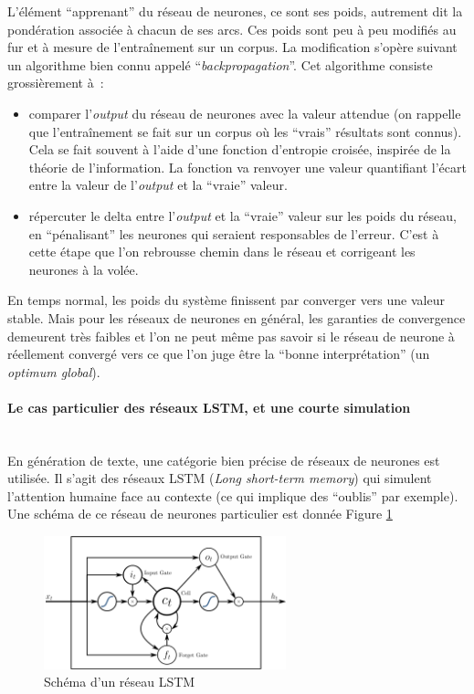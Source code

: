 \documentclass{article}
\newcommand{\subsubsubsection}[1]{\paragraph{#1}\mbox{}\\}
\begin{document}
					L'élément ``apprenant'' du réseau de neurones, ce sont ses poids, autrement dit la pondération associée à chacun de ses arcs. Ces poids sont peu à peu modifiés au fur et à mesure de l'entraînement sur un corpus. La modification s'opère suivant un algorithme bien connu appelé ``\textit{backpropagation}''. Cet algorithme consiste grossièrement à~:
					\vspace{2mm}
					\begin{itemize}
						\item comparer l'\textit{output} du réseau de neurones avec la valeur attendue (on rappelle que l'entraînement se fait sur un corpus où les ``vrais'' résultats sont connus). Cela se fait souvent à  l'aide d'une fonction d'entropie croisée, inspirée de la théorie de l'information. La fonction va renvoyer une valeur quantifiant l'écart entre la valeur de l'\textit{output} et la ``vraie'' valeur.
						\item répercuter le delta entre l'\textit{output} et la ``vraie'' valeur sur les poids du réseau, en ``pénalisant'' les neurones qui seraient responsables de l'erreur. C'est à cette étape que l'on rebrousse chemin dans le réseau et corrigeant les neurones à la volée.
					\end{itemize}
					\vspace{2mm}
					En temps normal, les poids du système finissent par converger vers une valeur stable. Mais pour les réseaux de neurones en général, les garanties de convergence demeurent très faibles et l'on ne peut même pas savoir si le réseau de neurone à réellement convergé vers ce que l'on juge être la ``bonne interprétation'' (un \textit{optimum global}).
				\subsubsubsection{Le cas particulier des réseaux LSTM, et une courte simulation}\label{lstm_hugo}
					En génération de texte, une catégorie bien précise de réseaux de neurones est utilisée. Il s'agit des réseaux LSTM (\textit{Long short-term memory}) qui simulent l'attention humaine face au contexte (ce qui implique des ``oublis'' par exemple). Une schéma de ce réseau de neurones particulier est donnée Figure \ref{fig:lstm}
					\begin{figure}
						\centering
						\includegraphics[width=7cm]{lstm.png}
						\caption{Schéma d'un réseau LSTM}
						\label{fig:lstm}
					\end{figure}
\end{document}
